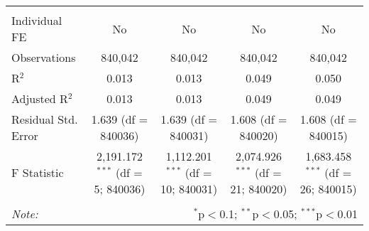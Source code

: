 \documentclass[
]{article}
\begin{document}
\begin{table}[!htbp]
{\begin{tabular}{@{\extracolsep{5pt}}lcccc}
\hline \\[-1.8ex] 
Individual FE & No & No & No & No \\ 
Observations & 840,042 & 840,042 & 840,042 & 840,042 \\ 
R$^{2}$ & 0.013 & 0.013 & 0.049 & 0.050 \\ 
Adjusted R$^{2}$ & 0.013 & 0.013 & 0.049 & 0.049 \\ 
Residual Std. Error & 1.639 (df = 840036) & 1.639 (df = 840031) & 1.608 (df = 840020) & 1.608 (df = 840015) \\ 
F Statistic & 2,191.172$^{***}$ (df = 5; 840036) & 1,112.201$^{***}$ (df = 10; 840031) & 2,074.926$^{***}$ (df = 21; 840020) & 1,683.458$^{***}$ (df = 26; 840015) \\ 
\hline 
\hline \\[-1.8ex] 
\textit{Note:}  & \multicolumn{4}{r}{$^{*}$p$<$0.1; $^{**}$p$<$0.05; $^{***}$p$<$0.01} \\ 
\end{tabular}
} 
\end{table} 
\newpage
\end{document}
